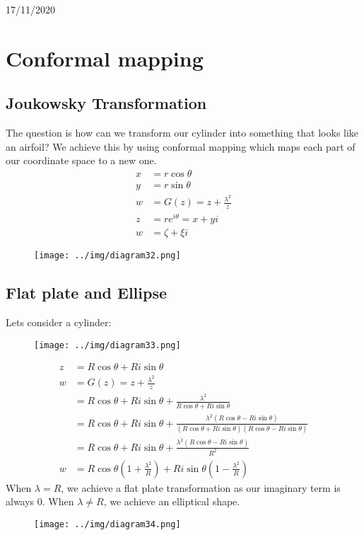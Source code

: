 \documentclass[class=report, crop=false, 12pt,a4paper]{standalone}
\begin{document}
\begin{center}
    17/11/2020
\end{center}
\section{Conformal mapping}
\subsection{Joukowsky Transformation}
The question is how can we transform our cylinder into something that looks like an airfoil? We achieve this by using conformal mapping which maps each part of our coordinate space to a new one. 
\begin{align}
  x &= r\cos{\theta}\\
  y &= r\sin{\theta}\\
  w &= G(z) = z + \frac{\lambda^2}{z}\\
  z &= re^{i\theta} = x + yi\\
  w &= \zeta + \xi i
\end{align}
\begin{figure}[H]
  \centering
  \texttt{[image: ../img/diagram32.png]}
\end{figure}
\subsection{Flat plate and Ellipse}
Lets consider a cylinder:
\begin{figure}[H]
  \centering
  \texttt{[image: ../img/diagram33.png]}
\end{figure}
\begin{align}
  z &= R\cos{\theta} + Ri\sin{\theta}\\
  w &= G(z) = z + \frac{\lambda^2}{z}\\
  &=  R\cos{\theta} + Ri\sin{\theta} + \frac{\lambda^2}{R\cos{\theta} + Ri\sin{\theta}}\\
  &= R\cos{\theta} + Ri\sin{\theta} + \frac{\lambda^2 (R\cos{\theta} - Ri\sin{\theta})}{(R\cos{\theta} + Ri\sin{\theta})(R\cos{\theta} - Ri\sin{\theta})}\\
  &= R\cos{\theta} + Ri\sin{\theta} + \frac{\lambda^2 (R\cos{\theta} - Ri\sin{\theta})}{R^2}\\
  w &= R\cos{\theta} \left(1 + \frac{\lambda^2}{R}\right) + Ri\sin{\theta} \left(1 - \frac{\lambda^2}{R}\right)
\end{align}
When $\lambda = R$, we achieve a flat plate transformation as our imaginary term is always 0. When $\lambda \neq R$, we achieve an elliptical shape.
\begin{figure}[H]
  \centering
  \texttt{[image: ../img/diagram34.png]}
\end{figure}
\end{document}
